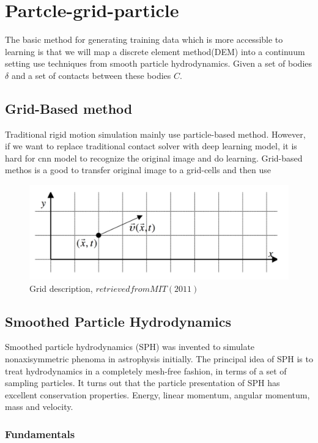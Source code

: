 
\chapter{Partcle-grid-particle}
    The basic method for generating training data which is more accessible to learning is that we will map a discrete element method(DEM) into a continuum setting use techniques from smooth particle hydrodynamics. Given a set of bodies $\delta$ and a set of contacts between these bodies $C$.

\section{Grid-Based method}
    Traditional rigid motion simulation mainly use particle-based method. However, if we want to replace traditional contact solver with deep learning model, it is hard for cnn model to recognize the original image and do learning. Grid-based methos is a good to transfer original image to a grid-cells and then use

    \begin{figure}
        \centering
        \includegraphics[scale = 0.4]{Figures/grid_method.png}
        \caption{Grid description, $retrieved from MIT(2011)$}
    \end{figure}

\section{Smoothed Particle Hydrodynamics}
    Smoothed particle hydrodynamics (SPH) was invented to simulate nonaxisymmetric phenoma in astrophysis initially. The principal idea of SPH is to treat hydrodynamics in a completely mesh-free fashion, in terms of a set of sampling particles. It turns out that the particle presentation of SPH has excellent conservation properties. Energy, linear momentum, angular momentum, mass and velocity.

    \subsection{Fundamentals}

